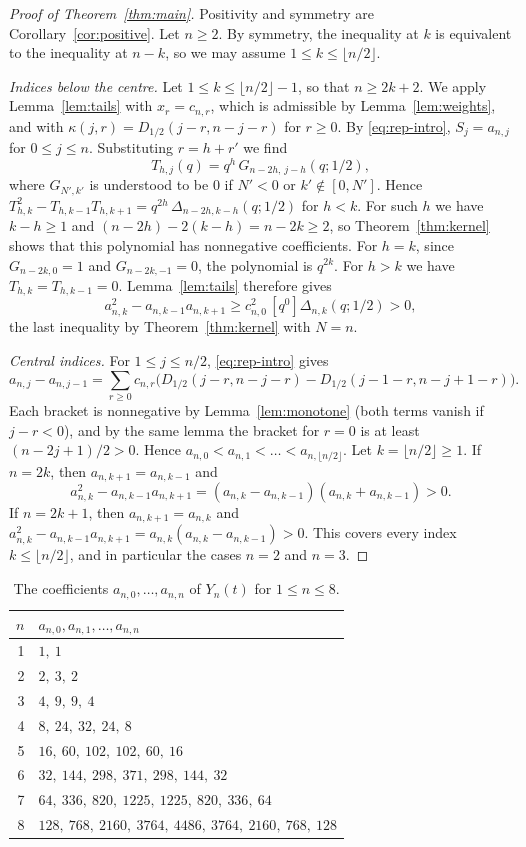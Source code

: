 \documentclass{amsart}
\theoremstyle{definition}
\theoremstyle{remark}
\numberwithin{equation}{section}
\numberwithin{table}{section}
\newcommand{\Dh}{D_{1/2}}
\newcommand{\coef}[1]{[#1]}
\begin{document}
\begin{proof}[Proof of Theorem~\ref{thm:main}]
Positivity and symmetry are Corollary~\ref{cor:positive}. Let $n\ge 2$. By symmetry, the inequality at $k$ is equivalent to the inequality at $n-k$, so we may assume $1\le k\le\lfloor n/2\rfloor$.

\emph{Indices below the centre.} Let $1\le k\le\lfloor n/2\rfloor-1$, so that $n\ge 2k+2$. We apply Lemma~\ref{lem:tails} with $x_r=c_{n,r}$, which is admissible by Lemma~\ref{lem:weights}, and with $\kappa(j,r)=\Dh(j-r,n-j-r)$ for $r\ge 0$. By \eqref{eq:rep-intro}, $S_j=a_{n,j}$ for $0\le j\le n$. Substituting $r=h+r'$ we find
\[
T_{h,j}(q)=q^h\,G_{n-2h,\,j-h}(q;1/2),
\]
where $G_{N',k'}$ is understood to be $0$ if $N'<0$ or $k'\notin[0,N']$. Hence $T_{h,k}^2-T_{h,k-1}T_{h,k+1}=q^{2h}\,\Delta_{n-2h,k-h}(q;1/2)$ for $h<k$. For such $h$ we have $k-h\ge 1$ and $(n-2h)-2(k-h)=n-2k\ge 2$, so Theorem~\ref{thm:kernel} shows that this polynomial has nonnegative coefficients. For $h=k$, since $G_{n-2k,0}=1$ and $G_{n-2k,-1}=0$, the polynomial is $q^{2k}$. For $h>k$ we have $T_{h,k}=T_{h,k-1}=0$. Lemma~\ref{lem:tails} therefore gives
\[
a_{n,k}^2-a_{n,k-1}a_{n,k+1}\ge c_{n,0}^2\,\coef{q^0}\Delta_{n,k}(q;1/2)>0,
\]
the last inequality by Theorem~\ref{thm:kernel} with $N=n$.

\emph{Central indices.} For $1\le j\le n/2$, \eqref{eq:rep-intro} gives
\[
a_{n,j}-a_{n,j-1}=\sum_{r\ge 0}c_{n,r}\bigl(\Dh(j-r,n-j-r)-\Dh(j-1-r,n-j+1-r)\bigr).
\]
Each bracket is nonnegative by Lemma~\ref{lem:monotone} (both terms vanish if $j-r<0$), and by the same lemma the bracket for $r=0$ is at least $(n-2j+1)/2>0$. Hence $a_{n,0}<a_{n,1}<\dots<a_{n,\lfloor n/2\rfloor}$. Let $k=\lfloor n/2\rfloor\ge 1$. If $n=2k$, then $a_{n,k+1}=a_{n,k-1}$ and
\[
a_{n,k}^2-a_{n,k-1}a_{n,k+1}=(a_{n,k}-a_{n,k-1})(a_{n,k}+a_{n,k-1})>0.
\]
If $n=2k+1$, then $a_{n,k+1}=a_{n,k}$ and $a_{n,k}^2-a_{n,k-1}a_{n,k+1}=a_{n,k}(a_{n,k}-a_{n,k-1})>0$. This covers every index $k\le\lfloor n/2\rfloor$, and in particular the cases $n=2$ and $n=3$.
\end{proof}

\begin{table}[ht]
\caption{The coefficients $a_{n,0},\dots,a_{n,n}$ of $Y_n(t)$ for $1\le n\le 8$.}\label{tab:rows}
\begin{tabular}{rl}
\toprule
$n$ & $a_{n,0},a_{n,1},\dots,a_{n,n}$\\
\midrule
1 & $1,\ 1$\\
2 & $2,\ 3,\ 2$\\
3 & $4,\ 9,\ 9,\ 4$\\
4 & $8,\ 24,\ 32,\ 24,\ 8$\\
5 & $16,\ 60,\ 102,\ 102,\ 60,\ 16$\\
6 & $32,\ 144,\ 298,\ 371,\ 298,\ 144,\ 32$\\
7 & $64,\ 336,\ 820,\ 1225,\ 1225,\ 820,\ 336,\ 64$\\
8 & $128,\ 768,\ 2160,\ 3764,\ 4486,\ 3764,\ 2160,\ 768,\ 128$\\
\bottomrule
\end{tabular}
\end{table}
\end{document}
